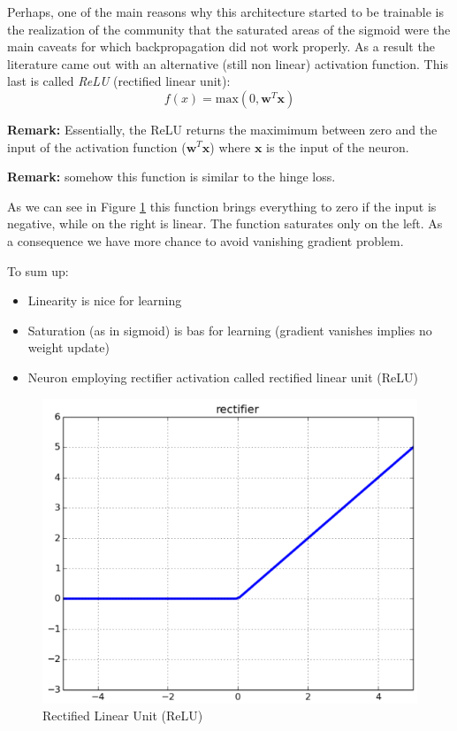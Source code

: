 Perhaps, one of the main reasons why this architecture started to be trainable is the realization of the community that the saturated areas of the sigmoid were the main caveats for which backpropagation did not work properly. As a result the literature came out with an alternative (still non linear) activation function. This last is called \textit{ReLU} (rectified linear unit):
\begin{equation}
    f(x) = \text{max}(0, \pmb{w}^T \pmb{x})
\end{equation}

\textbf{Remark:} Essentially, the ReLU returns the maximimum between zero and the input of the activation function ($\pmb{w}^T \pmb{x}$) where $\pmb{x}$ is the input of the neuron. \newline

\textbf{Remark:} somehow this function is similar to the hinge loss. \newline

As we can see in Figure \ref{fig:relu} this function brings everything to zero if the input is negative, while on the right is linear. The function saturates only on the left. As a consequence we have more chance to avoid vanishing gradient problem. \newline

To sum up:
\begin{itemize}
    \item Linearity is nice for learning
    \item Saturation (as in sigmoid) is bas for learning (gradient vanishes implies no weight update)
    \item Neuron employing rectifier activation called rectified linear unit (ReLU)
\end{itemize}

\begin{figure}
    \centering
    \includegraphics[scale=0.5]{images/relu.png}
    \caption{Rectified Linear Unit (ReLU)}
    \label{fig:relu}
\end{figure}

